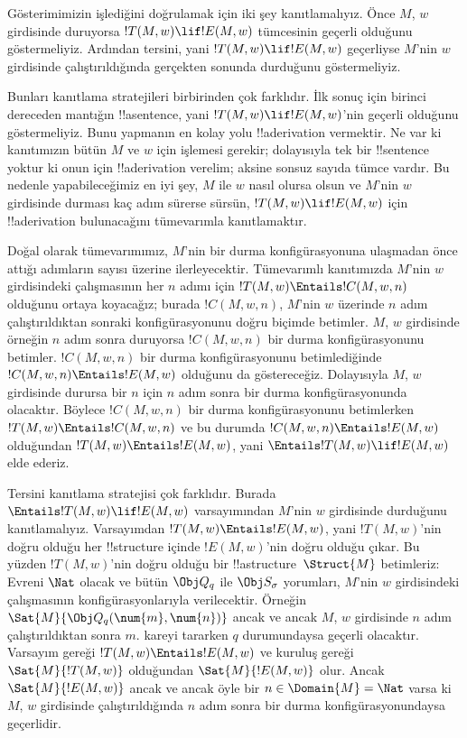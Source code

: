 


\begin{explain}
Gösterimimizin işlediğini doğrulamak için iki şey kanıtlamalıyız. Önce $M$,
$w$ girdisinde duruyorsa $!T(M,w)\lif !E(M,w)$ tümcesinin geçerli olduğunu
göstermeliyiz. Ardından tersini, yani $!T(M,w)\lif !E(M,w)$ geçerliyse
$M$'nin $w$ girdisinde çalıştırıldığında gerçekten sonunda durduğunu
göstermeliyiz.

Bunları kanıtlama stratejileri birbirinden çok farklıdır. İlk sonuç için
birinci dereceden mantığın !!a{sentence}, yani $!T(M,w)\lif !E(M,w)$'nin
geçerli olduğunu göstermeliyiz. Bunu yapmanın en kolay yolu !!a{derivation}
vermektir. Ne var ki kanıtımızın bütün $M$ ve $w$ için işlemesi gerekir;
dolayısıyla tek bir !!{sentence} yoktur ki onun için !!a{derivation} verelim;
aksine sonsuz sayıda tümce vardır. Bu nedenle yapabileceğimiz en iyi şey,
$M$ ile
$w$ nasıl olursa olsun ve $M$'nin $w$ girdisinde durması kaç adım sürerse
sürsün, $!T(M,w)\lif !E(M,w)$ için !!a{derivation} bulunacağını tümevarımla
kanıtlamaktır.

Doğal olarak tümevarımımız, $M$'nin bir durma konfigürasyonuna ulaşmadan önce
attığı adımların sayısı üzerine ilerleyecektir. Tümevarımlı kanıtımızda
$M$'nin $w$ girdisindeki çalışmasının her $n$ adımı için
$!T(M,w)\Entails !C(M,w,n)$ olduğunu ortaya koyacağız; burada $!C(M,w,n)$,
$M$'nin $w$ üzerinde $n$ adım çalıştırıldıktan sonraki konfigürasyonunu doğru
biçimde betimler. $M$, $w$ girdisinde örneğin $n$ adım sonra duruyorsa
$!C(M,w,n)$ bir durma konfigürasyonunu betimler. $!C(M,w,n)$ bir durma
konfigürasyonunu betimlediğinde $!C(M,w,n)\Entails !E(M,w)$ olduğunu da
göstereceğiz. Dolayısıyla $M$, $w$ girdisinde durursa bir $n$ için $n$ adım
sonra bir durma konfigürasyonunda olacaktır. Böylece $!C(M,w,n)$ bir durma
konfigürasyonunu betimlerken $!T(M,w)\Entails !C(M,w,n)$ ve bu durumda
$!C(M,w,n)\Entails !E(M,w)$ olduğundan $!T(M,w)\Entails !E(M,w)$, yani
$\Entails !T(M,w)\lif !E(M,w)$ elde ederiz.

Tersini kanıtlama stratejisi çok farklıdır. Burada
$\Entails !T(M,w)\lif !E(M,w)$ varsayımından $M$'nin $w$ girdisinde durduğunu
kanıtlamalıyız. Varsayımdan $!T(M,w)\Entails !E(M,w)$, yani $!T(M,w)$'nin
doğru olduğu her !!{structure} içinde $!E(M,w)$'nin doğru olduğu çıkar.
Bu yüzden $!T(M,w)$'nin doğru olduğu bir !!a{structure}~$\Struct{M}$ betimleriz:
Evreni $\Nat$ olacak ve bütün $\Obj Q_q$ ile $\Obj S_\sigma$ yorumları,
$M$'nin $w$ girdisindeki çalışmasının konfigürasyonlarıyla verilecektir.
Örneğin $\Sat{M}{\Obj Q_q(\num{m},\num{n})}$ ancak ve ancak $M$, $w$
girdisinde $n$ adım çalıştırıldıktan sonra $m$. kareyi tararken $q$
durumundaysa geçerli olacaktır. Varsayım gereği
$!T(M,w)\Entails !E(M,w)$ ve kuruluş gereği $\Sat{M}{!T(M,w)}$ olduğundan
$\Sat{M}{!E(M,w)}$ olur. Ancak $\Sat{M}{!E(M,w)}$ ancak ve ancak öyle bir
$n\in\Domain{M}=\Nat$ varsa ki $M$, $w$ girdisinde
çalıştırıldığında $n$ adım sonra bir durma konfigürasyonundaysa geçerlidir.
\end{explain}

